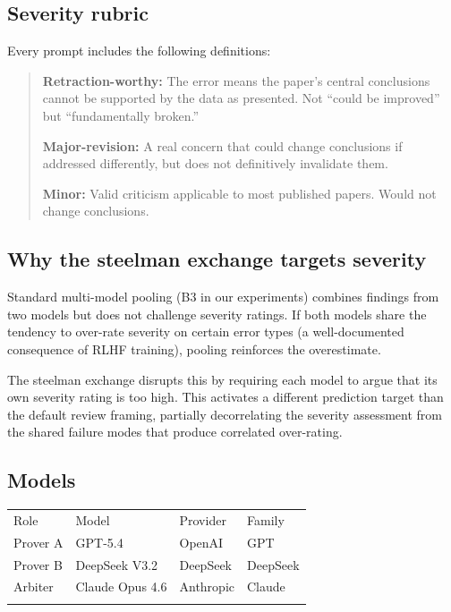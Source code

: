 \documentclass{ws-ijprai}
\begin{document}
\subsection{Severity rubric}

Every prompt includes the following definitions:

\begin{quote}
\textbf{Retraction-worthy:} The error means the paper's central conclusions
cannot be supported by the data as presented. Not ``could be improved'' but
``fundamentally broken.''

\textbf{Major-revision:} A real concern that could change conclusions if
addressed differently, but does not definitively invalidate them.

\textbf{Minor:} Valid criticism applicable to most published papers. Would not
change conclusions.
\end{quote}

\subsection{Why the steelman exchange targets severity}

Standard multi-model pooling (B3 in our experiments) combines findings from two
models but does not challenge severity ratings. If both models share the
tendency to over-rate severity on certain error types (a well-documented
consequence of RLHF training\cite{brilliant2026selfcorrection}), pooling
reinforces the overestimate.

The steelman exchange disrupts this by requiring each model to argue that its
own severity rating is too high. This activates a different prediction target
than the default review framing, partially decorrelating the severity assessment
from the shared failure modes that produce correlated over-rating.

\subsection{Models}

\begin{table}[h]
{\begin{tabular}{@{}llll@{}}
\toprule
Role & Model & Provider & Family \\
\colrule
Prover A & GPT-5.4 & OpenAI & GPT \\
Prover B & DeepSeek V3.2 & DeepSeek & DeepSeek \\
Arbiter & Claude Opus 4.6 & Anthropic & Claude \\
\botrule
\end{tabular}\label{tab:models}}
\end{table}
\end{document}

